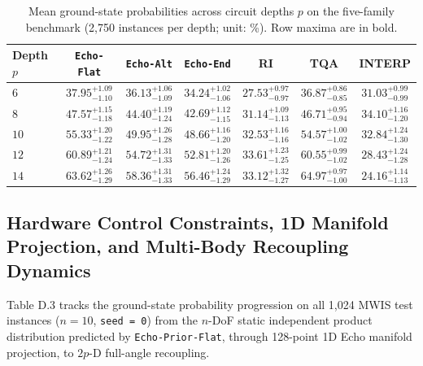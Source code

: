 \documentclass{article}
\theoremstyle{plain}
\theoremstyle{definition}
\begin{document}
\begin{table}[htbp]
\vskip -0.04in
\caption{Mean ground-state probabilities across circuit depths $p$ on the five-family benchmark (2,750 instances per depth; unit: \%). Row maxima are in bold.}
\label{tab:d_2}
\vskip 0.01in
\centering
\footnotesize
\renewcommand{\arraystretch}{0.96}
\setlength{\tabcolsep}{4.0pt}
\begin{tabular}{lcccccc}
\toprule
Depth $p$ & \texttt{Echo-Flat} & \texttt{Echo-Alt} & \texttt{Echo-End} & RI & TQA & INTERP \\
\midrule
$6$ & $\mathbf{37.95}^{+1.09}_{-1.10}$ & $36.13^{+1.06}_{-1.09}$ & $34.24^{+1.02}_{-1.06}$ & $27.53^{+0.97}_{-0.97}$ & $36.87^{+0.86}_{-0.85}$ & $31.03^{+0.99}_{-0.99}$ \\
$8$ & $\mathbf{47.57}^{+1.15}_{-1.18}$ & $44.40^{+1.19}_{-1.24}$ & $42.69^{+1.12}_{-1.15}$ & $31.14^{+1.09}_{-1.13}$ & $46.71^{+0.95}_{-0.94}$ & $34.10^{+1.16}_{-1.20}$ \\
$10$ & $\mathbf{55.33}^{+1.20}_{-1.22}$ & $49.95^{+1.26}_{-1.28}$ & $48.66^{+1.16}_{-1.20}$ & $32.53^{+1.16}_{-1.16}$ & $54.57^{+1.00}_{-1.02}$ & $32.84^{+1.24}_{-1.30}$ \\
$12$ & $\mathbf{60.89}^{+1.21}_{-1.24}$ & $54.72^{+1.31}_{-1.33}$ & $52.81^{+1.20}_{-1.26}$ & $33.61^{+1.23}_{-1.25}$ & $60.55^{+0.99}_{-1.02}$ & $28.43^{+1.24}_{-1.28}$ \\
$14$ & $63.62^{+1.26}_{-1.29}$ & $58.36^{+1.31}_{-1.33}$ & $56.46^{+1.24}_{-1.29}$ & $33.12^{+1.32}_{-1.27}$ & $\mathbf{64.97}^{+0.97}_{-1.00}$ & $24.16^{+1.14}_{-1.13}$ \\
\bottomrule
\end{tabular}%
\vskip -0.02in
\end{table}
\subsection{Hardware Control Constraints, 1D Manifold Projection, and Multi-Body Recoupling Dynamics}\label{subsec:d_2}

Table D.3 tracks the ground-state probability progression on all 1,024 MWIS test instances ($n=10$, \texttt{seed = 0}) from the $n$-DoF static independent product distribution predicted by \texttt{Echo-Prior-Flat}, through 128-point 1D Echo manifold projection, to $2p$-D full-angle recoupling.
\end{document}
